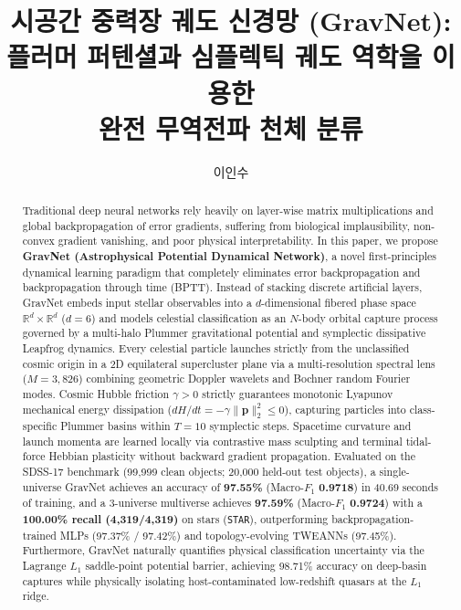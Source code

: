 \documentclass[journal]{IEEEtran}
\title{시공간 중력장 궤도 신경망 (GravNet):\\플러머 퍼텐셜과 심플렉틱 궤도 역학을 이용한\\완전 무역전파 천체 분류}
\author{이인수}%
\begin{document}
\maketitle

\begin{abstract}
Traditional deep neural networks rely heavily on layer-wise matrix multiplications and global backpropagation of error gradients, suffering from biological implausibility, non-convex gradient vanishing, and poor physical interpretability. In this paper, we propose \textbf{GravNet (Astrophysical Potential Dynamical Network)}, a novel first-principles dynamical learning paradigm that completely eliminates error backpropagation and backpropagation through time (BPTT). Instead of stacking discrete artificial layers, GravNet embeds input stellar observables into a $d$-dimensional fibered phase space $\mathbb{R}^d \times \mathbb{R}^d$ ($d=6$) and models celestial classification as an $N$-body orbital capture process governed by a multi-halo Plummer gravitational potential and symplectic dissipative Leapfrog dynamics. Every celestial particle launches strictly from the unclassified cosmic origin in a 2D equilateral supercluster plane via a multi-resolution spectral lens ($M=3,826$) combining geometric Doppler wavelets and Bochner random Fourier modes. Cosmic Hubble friction $\gamma > 0$ strictly guarantees monotonic Lyapunov mechanical energy dissipation ($dH/dt = -\gamma \|\mathbf{p}\|_2^2 \le 0$), capturing particles into class-specific Plummer basins within $T=10$ symplectic steps. Spacetime curvature and launch momenta are learned locally via contrastive mass sculpting and terminal tidal-force Hebbian plasticity without backward gradient propagation. Evaluated on the SDSS-17 benchmark (99,999 clean objects; 20,000 held-out test objects), a single-universe GravNet achieves an accuracy of \textbf{97.55\%} (Macro-$F_1$ \textbf{0.9718}) in 40.69 seconds of training, and a 3-universe multiverse achieves \textbf{97.59\%} (Macro-$F_1$ \textbf{0.9724}) with a \textbf{100.00\% recall (4,319/4,319)} on stars (\texttt{STAR}), outperforming backpropagation-trained MLPs (97.37\% / 97.42\%) and topology-evolving TWEANNs (97.45\%). Furthermore, GravNet naturally quantifies physical classification uncertainty via the Lagrange $L_1$ saddle-point potential barrier, achieving 98.71\% accuracy on deep-basin captures while physically isolating host-contaminated low-redshift quasars at the $L_1$ ridge.
\end{abstract}
\end{document}
